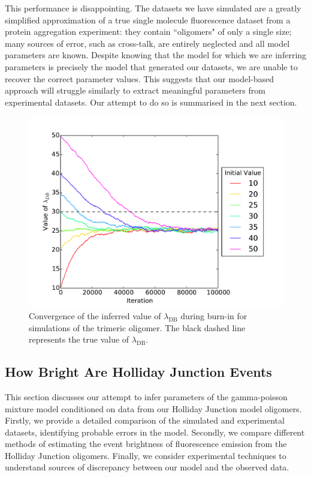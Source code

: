 This performance is disappointing. The datasets we have simulated are a greatly simplified approximation of a true single molecule fluorescence dataset from a protein aggregation experiment: they contain ``oligomers" of only a single size; many sources of error, such as cross-talk, are entirely neglected and all model parameters are known. Despite knowing that the model for which we are inferring parameters is precisely the model that generated our datasets, we are unable to recover the correct parameter values. This suggests that our model-based approach will struggle similarly to extract meaningful parameters from experimental datasets. Our attempt to do so is summarised in the next section.

\begin{figure}
   \begin{center}
      \includegraphics*[clip=true, width=6in]{sizing/Convergence.pdf}
      \caption{Convergence of the inferred value of $\lambda_{\text{DB}}$ during burn-in for simulations of the trimeric oligomer. The black dashed line represents the true value of $\lambda_{\text{DB}}$.}
      \label{fig:convergence}
   \end{center}
\end{figure}

\subsection{How Bright Are Holliday Junction Events}
This section discusses our attempt to infer parameters of the gamma-poisson mixture model conditioned on data from our Holliday Junction model oligomers. Firstly, we provide a detailed comparison of the simulated and experimental datasets, identifying probable errors in the model. Secondly, we compare different methods of estimating the event brightness of fluorescence emission from the Holliday Junction oligomers. Finally, we consider experimental techniques to understand sources of discrepancy between our model and the observed data.

